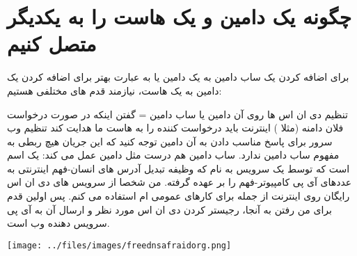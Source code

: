 \section{چگونه یک دامین و یک هاست را به یکدیگر متصل کنیم}
برای اضافه کردن یک ساب دامین به یک دامین یا به عبارت بهتر برای اضافه کردن یک دامین به یک هاست، نیازمند قدم های مختلفی هستیم:

تنظیم دی ان اس ها روی آن دامین یا ساب دامین = گفتن اینکه در صورت درخواست فلان دامنه (مثلا ) اینترنت باید درخواست کننده را به هاست ما هدایت کند
تنظیم وب سرور برای پاسخ مناسب دادن به آن دامین
توجه کنید که این جریان هیچ ربطی به مفهوم ساب دامین ندارد. ساب دامین هم درست مثل دامین عمل می کند: یک اسم است که توسط یک سرویس به نام  که وظیفه تبدیل آدرس های انسان-فهم اینترنتی به عددهای آی پی کامپیوتر-فهم را بر عهده گرفته. من شخصا از سرویس های دی ان اس رایگان روی اینترنت از جمله
\href{http://freedns.afraid.org}{}
  برای کارهای عمومی ام استفاده می کنم. پس اولین قدم برای من رفتن به آنجا، رجیستر کردن دی ان اس مورد نظر و ارسال آن به آی پی سرویس دهنده وب است.

\texttt{[image: ../files/images/freednsafraidorg.png]}

